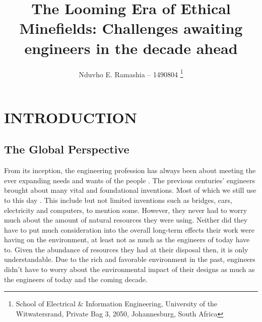 \documentclass[12pt]{witseiepaper}
\begin{document}
\title{The Looming Era of Ethical Minefields: Challenges awaiting engineers in the decade ahead}

\author{Nduvho E. Ramashia -- 1490804 
\thanks{School of Electrical \& Information Engineering, University of the Witwatersrand, Private Bag 3, 2050, Johannesburg, South Africa} 
} 




\maketitle
\thispagestyle{empty}
\pagestyle{empty}



\section{INTRODUCTION} 

    \subsection{The Global Perspective} 

    From its inception, the engineering profession has always been about meeting the ever expanding needs and wants of the people \cite{cruickshank2003changing}. The previous centuries' engineers brought about many vital and foundational inventions. Most of which we still use to this day \cite{cruickshank2003changing}. This include but not limited inventions such as bridges, cars, electricity and computers, to mention some. However, they never had to worry much about the amount of natural resources they were using. Neither did they have to put much consideration into the overall long-term effects their work were having on the environment, at least not as much as the engineers of today have to. Given the abundance of resources they had at their disposal then, it is only understandable. Due to the rich and favorable environment in the past, engineers didn't have to worry about the environmental impact of their designs as much as the engineers of today and the coming decade.
    
\end{document}
